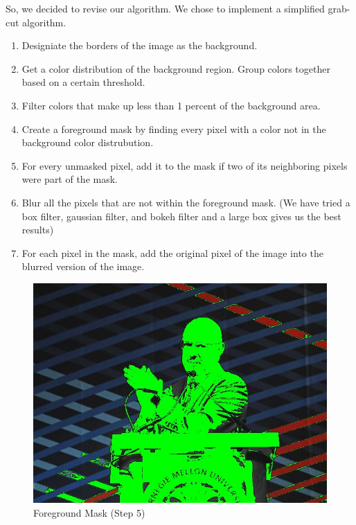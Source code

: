 \documentclass[12pt]{article}
\begin{document}
So, we decided to revise our algorithm. We chose to implement a simplified
grab-cut algorithm.

\begin{enumerate}
    \item
        Designiate the borders of the image as the background.
    \item
        Get a color distribution of the background region. Group colors together
        based on a certain threshold.
    \item
        Filter colors that make up less than 1 percent of the background area.
    \item
        Create a foreground mask by finding every pixel with a color not
        in the background color distrubution.
    \item
        For every unmasked pixel, add it to the mask if two of its neighboring
        pixels were part of the mask.
    \item
        Blur all the pixels that are not within the foreground mask. (We have
        tried a box filter, gaussian filter, and bokeh filter and a large box
        gives us the best results)
    \item
        For each pixel in the mask, add the original pixel of the image into
        the blurred version of the image.
\end{enumerate}

\begin{figure}[!htb]
    \begin{minipage}{0.48\textwidth}
        \centering
        \includegraphics[width=0.9\linewidth]{farnam_dude.jpg}
        \caption{Foreground Mask (Step 5)}
    \end{minipage}\hfill
\end{figure}
\end{document}
